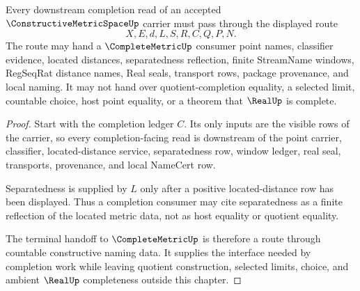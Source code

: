 \begin{theorem}
\label{thm:constructive-metric-space-separated-completion-route}
Every downstream completion read of an accepted $\ConstructiveMetricSpaceUp$ carrier must pass through the displayed route
$$
X,E,d,L,S,R,C,Q,P,N .
$$
The route may hand a $\CompleteMetricUp$ consumer point names, classifier evidence, located distances, separatedness reflection, finite StreamName windows, RegSeqRat distance names, Real seals, transport rows, package provenance, and local naming. It may not hand over quotient-completion equality, a selected limit, countable choice, host point equality, or a theorem that $\RealUp$ is complete.
\end{theorem}
\begin{proof}
Start with the completion ledger $C$. Its only inputs are the visible rows of the carrier, so every completion-facing read is downstream of the point carrier, classifier, located-distance service, separatedness row, window ledger, real seal, transports, provenance, and local NameCert row.

Separatedness is supplied by $L$ only after a positive located-distance row has been displayed. Thus a completion consumer may cite separatedness as a finite reflection of the located metric data, not as host equality or quotient equality.

The terminal handoff to $\CompleteMetricUp$ is therefore a route through countable constructive naming data. It supplies the interface needed by completion work while leaving quotient construction, selected limits, choice, and ambient $\RealUp$ completeness outside this chapter.
\end{proof}



